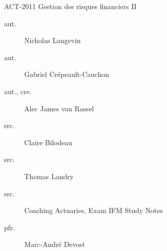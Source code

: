 \begin{contrib}{ACT-2011\: Gestion des risques financiers II}
\begin{description}
	\item[aut.] Nicholas Langevin
	\item[aut.] Gabriel Crépeault-Cauchon 
	\item[aut., cre.] Alec James van Rassel
	\item[src.] Claire Bilodeau
	\item[src.] Thomas Landry	
	\item[src.]	Coaching Actuaries, Exam IFM Study Notes
	\item[pfr.]	Marc-André Devost
\end{description}
\end{contrib}
